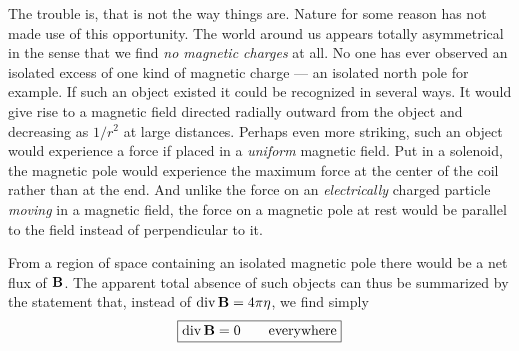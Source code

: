 The trouble is, that is not the way things are. Nature for some
reason has not made use of this opportunity. The world around us
appears totally asymmetrical in the sense that we find \emph{no magnetic
charges} at all. No one has ever observed an isolated excess of one
kind of magnetic charge --- an isolated north pole for example. If
such an object existed it could be recognized in several ways. It
would give rise to a magnetic field directed radially outward from
the object and decreasing as $1/r^2$ at large distances. Perhaps even
more striking, such an object would experience a force if placed in
a \emph{uniform} magnetic field. Put in a solenoid, the magnetic pole would
experience the maximum force at the center of the coil rather than
at the end. And unlike the force on an \emph{electrically} charged particle
\emph{moving} in a magnetic field, the force on a magnetic pole at rest would
be parallel to the field instead of perpendicular to it.

From a region of space containing an isolated magnetic pole there
would be a net flux of $\mathbf{B}$. The apparent total absence of such 
objects can thus be summarized by the statement that, instead of
$\operatorname{div}\mathbf{B} = 4\pi\eta$, we find simply
\begin{equation}
\boxed{
  \operatorname{div}\mathbf{B} = 0 \qquad \text{everywhere}
}
\end{equation}


